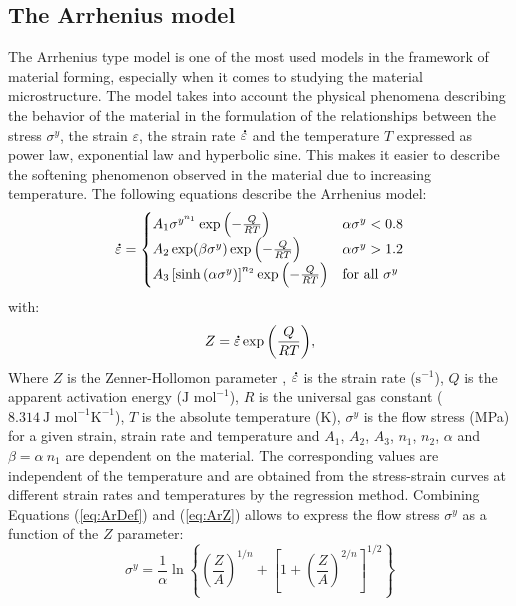 \documentclass[twoside,english,1p,final,sort&compress]{elsarticle}
\theoremstyle{plain}
\DeclareRobustCommand{\mdot}[1]{\accentset{\mbox{\bfseries .}}{#1}}
\DeclareRobustCommand{\ps}{\text{s}^{-1}}
\begin{document}
\subsection{The Arrhenius model\label{sec:ARmodel}}

The Arrhenius type model \cite{Sellars-1966} is one of the most used models in the framework of material forming, especially when it comes to studying the material microstructure.
The model takes into account the physical phenomena describing the behavior of the material in the formulation of the relationships between the stress $\sigma^y$, the strain $\varepsilon$, the strain rate $\mdot\varepsilon$ and the temperature $T$ expressed as power law, exponential law and hyperbolic sine.
This makes it easier to describe the softening phenomenon observed in the material due to increasing temperature.
The following equations describe the Arrhenius model:
\begin{equation}
\mdot\varepsilon =
\begin{cases}
A_1 \sigma^{y^{n_1}} \exp{\left(-\frac{Q}{RT}\right)} & \alpha\sigma^y < 0.8\\
A_2 \exp(\beta\sigma^y) \exp{\left(-\frac{Q}{RT}\right)} & \alpha\sigma^y > 1.2\\
A_3 \left[\sinh{\left(\alpha\sigma^y\right)}\right]^{n_2} \exp{\left(-\frac{Q}{RT}\right)} & \text{for all }\sigma^y
\end{cases}
\label{eq:ArDef}
\end{equation}
with:
\begin{equation}
Z = \mdot\varepsilon \exp{\left(\frac{Q}{RT}\right)}, \label{eq:ArZ}
\end{equation}
Where $Z$ is the Zenner-Hollomon parameter \cite{Zener-1944}, $\mdot\varepsilon$ is the strain rate ($\ps$), $Q$ is the apparent activation energy ($\text{J~mol}^{-1}$), $R$ is the universal gas constant ($8.314~\text{J~mol}^{-1} \text{K}^{-1}$), $T$ is the absolute temperature (K), $\sigma^y$ is the flow stress (MPa) for a given strain, strain rate and temperature and $A_1$, $A_2$, $A_3$, $n_1$, $n_2$, $\alpha$ and $\beta=\alpha~n_1$ are dependent on the material. The corresponding values are independent of the temperature and are obtained from the stress-strain curves at different strain rates and temperatures by the regression method. Combining Equations (\ref{eq:ArDef}) and (\ref{eq:ArZ}) allows to express the flow stress $\sigma^y$ as a function of the $Z$ parameter:
\begin{equation}
\sigma^y = \frac{1}{\alpha} \ln\left\{\left(\frac{Z}{A}\right)^{1/n} + \left[1 + \left(\frac{Z}{A}\right)^{2/n}\right]^{1/2}\right\}
\end{equation}
\end{document}
